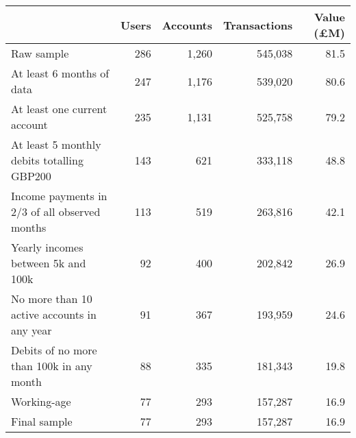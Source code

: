 \begin{tabular}{lrrrr}
\toprule
                                               & Users & Accounts & Transactions & Value (\pounds M) \\
\midrule
                                    Raw sample &   286 &    1,260 &      545,038 &              81.5 \\
                     At least 6 months of data &   247 &    1,176 &      539,020 &              80.6 \\
                  At least one current account &   235 &    1,131 &      525,758 &              79.2 \\
    At least 5 monthly debits totalling GBP200 &   143 &      621 &      333,118 &              48.8 \\
 Income payments in 2/3 of all observed months &   113 &      519 &      263,816 &              42.1 \\
            Yearly incomes between 5k and 100k &    92 &      400 &      202,842 &              26.9 \\
   No more than 10 active accounts in any year &    91 &      367 &      193,959 &              24.6 \\
      Debits of no more than 100k in any month &    88 &      335 &      181,343 &              19.8 \\
                                   Working-age &    77 &      293 &      157,287 &              16.9 \\
                                  Final sample &    77 &      293 &      157,287 &              16.9 \\
\bottomrule
\end{tabular}
